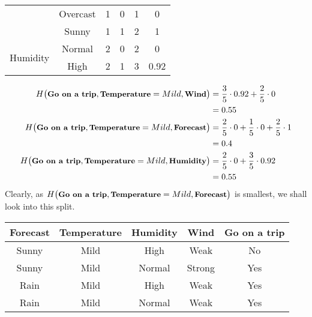 \documentclass[11pt]{article}
\begin{document}
\begin{enumerate}
\begin{table}[!ht]
\begin{tabular}{|c|c|c|c|c|c|}
                                & Overcast       & 1                       & 0                      & 1                                     & 0                                       \\ \cline{2-6} 
                                & Sunny          & 1                       & 1                      & 2                                     & 1                                       \\ \hline
\multirow{2}{*}{Humidity}       & Normal         & 2                       & 0                      & 2                                     & 0                                       \\ \cline{2-6} 
                                & High           & 2                       & 1                      & 3                                     & 0.92                                    \\ \hline
\end{tabular}
\end{table}
\begin{align*}
H \big(\textbf{\small Go on a trip},\textbf{\small Temperature}=Mild,\textbf{\small Wind}\big) &= \frac{3}{5} \cdot 0.92 +  \frac{2}{5} \cdot 0 \\
&= 0.55\\
H \big(\textbf{\small Go on a trip},\textbf{\small Temperature}=Mild,\textbf{\small Forecast}\big) &= \frac{2}{5} \cdot 0 +  \frac{1}{5} \cdot 0 +   \frac{2}{5} \cdot 1\\
&= 0.4\\
H \big(\textbf{\small Go on a trip},\textbf{\small Temperature}=Mild,\textbf{\small Humidity}\big) &= \frac{2}{5} \cdot 0 +  \frac{3}{5} \cdot 0.92\\
&= 0.55
\end{align*}
Clearly, as $H \big(\textbf{\small Go on a trip},\textbf{\small Temperature}=Mild,\textbf{\small Forecast}\big)$ is smallest, we shall look into this split.
\begin{center}
	\begin{table}[!ht]
	\centering
	\begin{tabular}{|c|c|c|c|c|}
		\hline
		\textbf{Forecast} & \textbf{Temperature} & \textbf{Humidity} & \textbf{Wind} & \textbf{Go on a trip}  \\ \hline
		Sunny             & Mild                 & High              & Weak          & No                    \\ \hline
		Sunny             & Mild                 & Normal            & Strong        & Yes                   \\ \hline		
		Rain              & Mild                 & High              & Weak          & Yes                   \\ \hline
		Rain              & Mild                 & Normal            & Weak          & Yes                   \\ \hline


\end{tabular}
\end{table}
\end{center}
\end{enumerate}
\end{document}
